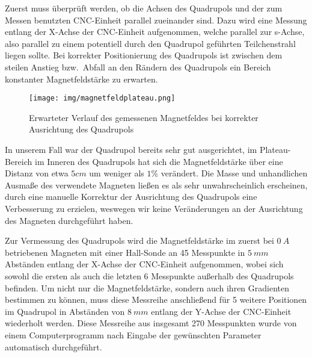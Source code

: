 \documentclass[bigchapter,colorback,accentcolor=tud4b,linedtoc,11pt]{tudreport}
\begin{document}
Zuerst muss überprüft werden, ob die Achsen des Quadrupols und der zum Messen benutzten CNC-Einheit parallel zueinander sind. Dazu wird eine Messung entlang der X-Achse der CNC-Einheit aufgenommen, welche parallel zur s-Achse, also parallel zu einem potentiell durch den Quadrupol geführten Teilchenstrahl liegen sollte. Bei korrekter Positionierung des Quadrupols ist zwischen dem steilen Anstieg bzw.\ Abfall an den Rändern des Quadrupols ein Bereich konstanter Magnetfeldstärke zu erwarten.
\begin{figure}[H]
\centering
\texttt{[image: img/magnetfeldplateau.png]}
\caption{Erwarteter Verlauf des gemessenen Magnetfeldes bei korrekter Ausrichtung des Quadrupols \cite{anleitung}}
\end{figure}
In unserem Fall war der Quadrupol bereits sehr gut ausgerichtet, im Plateau-Bereich im Inneren des Quadrupols hat sich die Magnetfeldstärke über eine Distanz von etwa $5 cm$ um weniger als $1\%$ verändert. Die Masse und unhandlichen Ausmaße des verwendete Magneten ließen es als sehr unwahrscheinlich erscheinen, durch eine manuelle Korrektur der Ausrichtung des Quadrupols eine Verbesserung zu erzielen, weswegen wir keine Veränderungen an der Ausrichtung des Magneten durchgeführt haben.

\begin{center}
\begin{figure}[H]
\end{figure}
\end{center}

Zur Vermessung des Quadrupols wird die Magnetfeldstärke im zuerst bei $0~A$ betriebenen Magneten mit einer Hall-Sonde an 45 Messpunkte in $5~mm$ Abständen entlang der X-Achse der CNC-Einheit aufgenommen, wobei sich sowohl die ersten als auch die letzten 6 Messpunkte außerhalb des Quadrupols befinden. Um nicht nur die Magnetfeldstärke, sondern auch ihren Gradienten bestimmen zu können, muss diese Messreihe anschließend für 5 weitere Positionen im Quadrupol in Abständen von $8~mm$ entlang der Y-Achse der CNC-Einheit wiederholt werden. Diese Messreihe aus insgesamt 270 Messpunkten wurde von einem Computerprogramm nach Eingabe der gewünschten Parameter automatisch durchgeführt.
\end{document}
